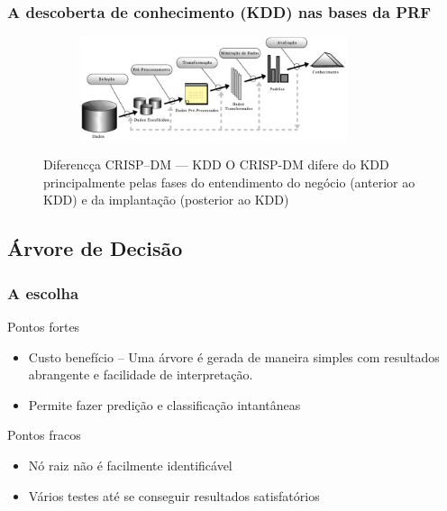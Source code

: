 \documentclass[11pt]{beamer}
\begin{document}
\begin{frame}\frametitle{ A descoberta de conhecimento (KDD) nas bases da PRF}
	\begin{figure}[!ht]
		\includegraphics[width=100mm, height=30mm]{Figuras/BigData/Fayyad.png}
		\pause
		\begin{alertblock}{ Diferencça CRISP--DM --- KDD}			
			O CRISP-DM difere do KDD principalmente pelas fases do entendimento do  negócio (anterior ao KDD) e da implantação (posterior ao KDD)
		\end{alertblock}
	\end{figure}
\end{frame}



\subsection{ Árvore de Decisão}

\begin{frame}\frametitle{ A escolha}
	\begin{exampleblock}{Pontos fortes}
		\begin{itemize}
			\item Custo benefício -- Uma árvore é gerada de maneira simples com resultados abrangente e facilidade de interpretação.
			\pause
			\item Permite fazer predição e classificação intantâneas
		\end{itemize}
	\end{exampleblock}
	\pause
	\begin{alertblock}{Pontos fracos}
		\begin{itemize}
			\item Nó raiz não é facilmente identificável
			\pause
			\item Vários testes até se conseguir resultados satisfatórios		
		\end{itemize}
	\end{alertblock}
\end{frame}
\end{document}
